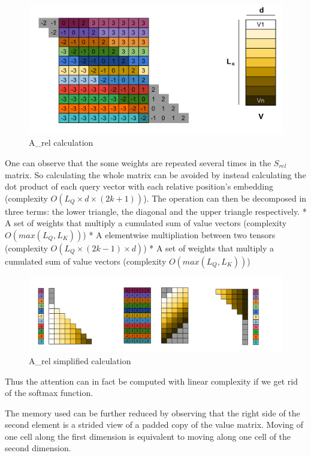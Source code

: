 \begin{figure}
\centering
\includegraphics{images/S_rel_V.png}
\caption{A\_rel calculation}
\end{figure}

One can observe that the some weights are repeated several times in the
\(S_{rel}\) matrix. So calculating the whole matrix can be avoided by
instead calculating the dot product of each query vector with each
relative position's embedding (complexity
\(O \left(L_Q\times d\times(2k+1)\right)\)). The operation can then be
decomposed in three terms: the lower triangle, the diagonal and the
upper triangle respectively. * A set of weights that multiply a
cumulated sum of value vectors (complexity \(O(max(L_Q, L_K))\)) * A
elementwise multipliation between two tensors (complexity
\(O(L_Q\times (2k-1) \times d)\)) * A set of weights that multiply a
cumulated sum of value vectors (complexity \(O(max(L_Q, L_K))\))

\begin{figure}
\centering
\includegraphics{images/S_rel_V_detailed.png}
\caption{A\_rel simplified calculation}
\end{figure}

Thus the attention can in fact be computed with linear complexity if we
get rid of the softmax function.

The memory used can be further reduced by observing that the right side
of the second element is a strided view of a padded copy of the value
matrix. Moving of one cell along the first dimension is equivalent to
moving along one cell of the second dimension.

